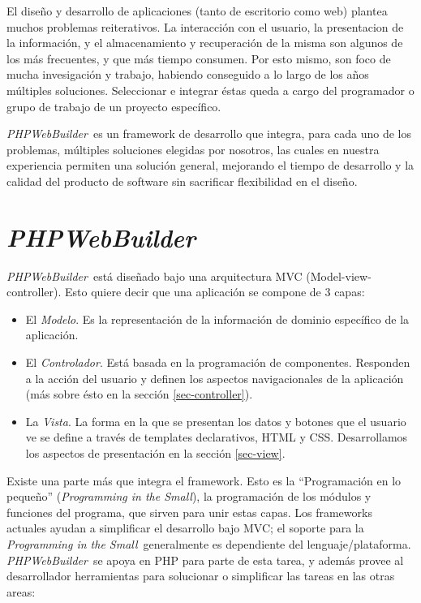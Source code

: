 \documentclass[a4paper,10pt]{article}
\newcommand{\PITS}{\emph{Programming in the Small}} %
\newcommand{\PWB}{\emph{PHPWebBuilder}}
\begin{document}
El diseño y desarrollo de aplicaciones (tanto de escritorio como web) plantea muchos problemas reiterativos. La interacción con el usuario, la presentacion de la información, y el almacenamiento y recuperación de la misma son algunos de los más frecuentes, y que más tiempo consumen.
Por esto mismo, son foco de mucha invesigación y trabajo, habiendo conseguido a lo largo de los años múltiples soluciones. Seleccionar e integrar éstas queda a cargo del programador o grupo de trabajo de un proyecto específico.

\PWB \ es un framework de desarrollo que integra, para cada uno de los problemas, múltiples soluciones elegidas por nosotros, las cuales en nuestra experiencia permiten una solución general, mejorando el tiempo de desarrollo y la calidad del producto de software sin sacrificar flexibilidad en el diseño.

\section{\PWB}

\PWB \ está diseñado bajo una arquitectura MVC (Model-view-controller)\cite{mvc}.
Esto quiere decir que una aplicación se compone de 3 capas:
\begin{itemize}
\item El \emph{Modelo}. Es la representación de la información de dominio específico de la aplicación.
\item El \emph{Controlador}. Está basada en la programación de componentes. Responden a la acción del usuario y definen los aspectos navigacionales de la aplicación (más sobre ésto en la sección \ref{sec-controller}).
\item La \emph{Vista}. La forma en la que se presentan los datos y botones que el usuario ve se define a través de templates declarativos, HTML y CSS. Desarrollamos los aspectos de presentación en la sección \ref{sec-view}.
\end{itemize}

Existe una parte más que integra el framework. Esto es la ``Programación en lo pequeño'' (\PITS), la programación de los módulos y funciones del programa, que sirven para unir estas capas. Los frameworks actuales ayudan a simplificar el desarrollo bajo MVC; el soporte para la \PITS \ generalmente es dependiente del lenguaje/plataforma. \PWB \ se apoya en PHP para parte de esta tarea, y además provee al desarrollador herramientas para solucionar o simplificar las tareas en las otras areas:
\end{document}
